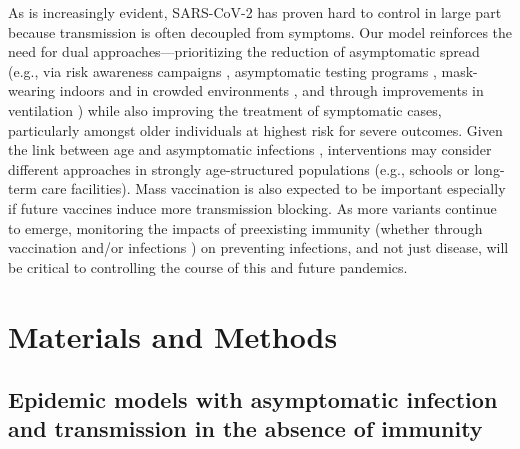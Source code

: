 \documentclass[12pt]{article}
\begin{document}
As is increasingly evident, SARS-CoV-2 has proven hard to control in large part because transmission is often decoupled from symptoms. 
Our model reinforces the need for dual approaches---prioritizing the reduction of asymptomatic spread (e.g., via risk awareness campaigns \cite{Bavel2020,chande2020real,sinclair2021pairing}, asymptomatic testing programs \cite{mina2021covid,gibson2022surv,Ranoa2022}, mask-wearing indoors and in crowded environments \cite{jones2020two,prather2020reducing,howard2021ev}, and through improvements in ventilation \cite{allen2021indoor,wang2021airborne}) while also improving the treatment of symptomatic cases, particularly amongst older individuals at highest risk for severe outcomes.
Given the link between age and asymptomatic infections \cite{davies2020}, interventions may consider different approaches in strongly age-structured populations (e.g., schools or long-term care facilities).
Mass vaccination is also expected to be important especially if future vaccines induce more transmission blocking.
As more variants continue to emerge, monitoring the impacts of preexisting immunity (whether through vaccination and/or infections  \cite{lopman2021framework}) on preventing infections, and not just disease, will be critical to controlling the course of this and future pandemics.

\section*{Materials and Methods}

\subsection*{Epidemic models with asymptomatic infection and transmission in the absence of immunity}
\end{document}
